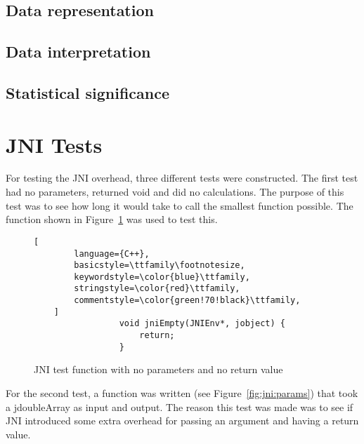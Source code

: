 

\subsection{Data representation}
\subsection{Data interpretation}
\subsection{Statistical significance}


\section{JNI Tests}
For testing the JNI overhead, three different tests were constructed. The first test had no parameters, returned void and did no calculations. The purpose of this test was to see how long it would take to call the smallest function possible. The function shown in Figure~\ref{fig:jni:empty} was used to test this.

\begin{figure}
\begin{lstlisting}[
        language={C++},
        basicstyle=\ttfamily\footnotesize,
        keywordstyle=\color{blue}\ttfamily,
        stringstyle=\color{red}\ttfamily,
        commentstyle=\color{green!70!black}\ttfamily,
    ]
                 void jniEmpty(JNIEnv*, jobject) {
                     return;
                 }
\end{lstlisting}
\caption{JNI test function with no parameters and no return value}
\label{fig:jni:empty}
\end{figure}

For the second test, a function was written (see Figure~\ref{fig:jni:params}) that took a jdoubleArray as input and output. The reason this test was made was to see if JNI introduced some extra overhead for passing an argument and having a return value.

